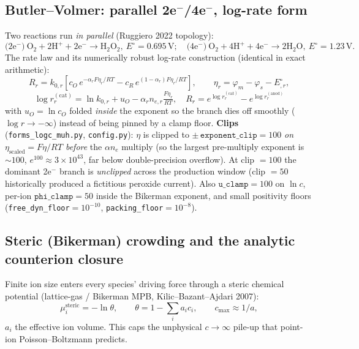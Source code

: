 \documentclass[11pt]{article}
\newcommand{\Eeq}{E^{\circ}}
\begin{document}
\subsection{Butler--Volmer: parallel 2e$^-$/4e$^-$, log-rate form}
Two reactions run \emph{in parallel} (Ruggiero 2022 topology):
\[
  \text{(2e$^-$)}\ \mathrm{O_2+2H^+ +2e^-\!\to H_2O_2},\ \Eeq=0.695\,\mathrm{V};
  \quad
  \text{(4e$^-$)}\ \mathrm{O_2+4H^+ +4e^-\!\to 2H_2O},\ \Eeq=1.23\,\mathrm{V}.
\]
The rate law and its numerically robust log-rate construction (identical in
exact arithmetic):
\[
  R_r = k_{0,r}\!\left[c_O\,e^{-\alpha_r F\eta_r/RT}
        - c_R\,e^{(1-\alpha_r)F\eta_r/RT}\right],
  \qquad \eta_r = \varphi_m-\varphi_s-\Eeq_{,r},
\]
\[
  \boxed{\;\log r_r^{(\mathrm{cat})} = \ln k_{0,r} + u_O
     - \alpha_r n_{e,r}\tfrac{F\eta_r}{RT},\quad
   R_r = e^{\log r_r^{(\mathrm{cat})}} - e^{\log r_r^{(\mathrm{anod})}}\;}
\]
with $u_O=\ln c_O$ folded \emph{inside} the exponent so the branch dies off
smoothly ($\log r\to-\infty$) instead of being pinned by a clamp floor.
\textbf{Clips} (\texttt{forms\_logc\_muh.py}, \texttt{config.py}):
$\eta$ is clipped to $\pm\,\texttt{exponent\_clip}=100$ \emph{on
$\eta_{\mathrm{scaled}}=F\eta/RT$ before} the $\alpha n_e$ multiply (so the
largest pre-multiply exponent is $\sim100$, $e^{100}\!\approx\!3\times10^{43}$,
far below double-precision overflow). At clip $=100$ the dominant 2e$^-$
branch is \emph{unclipped} across the production window (clip $=50$
historically produced a fictitious peroxide current). Also
$\texttt{u\_clamp}=100$ on $\ln c$, per-ion $\texttt{phi\_clamp}=50$ inside
the Bikerman exponent, and small positivity floors
(\texttt{free\_dyn\_floor}$=10^{-10}$, \texttt{packing\_floor}$=10^{-8}$).

\subsection{Steric (Bikerman) crowding and the analytic counterion closure}\label{sub:closure}
Finite ion size enters every species' driving force through a steric
chemical potential (lattice-gas / Bikerman MPB, Kilic--Bazant--Ajdari 2007):
\[
  \mu_i^{\mathrm{steric}}=-\ln\theta,\qquad
  \theta = 1-\sum_i a_i c_i,\qquad c_{\max}\approx 1/a ,
\]
$a_i$ the effective ion volume. This caps the unphysical
$c\!\to\!\infty$ pile-up that point-ion Poisson--Boltzmann predicts.
\end{document}
